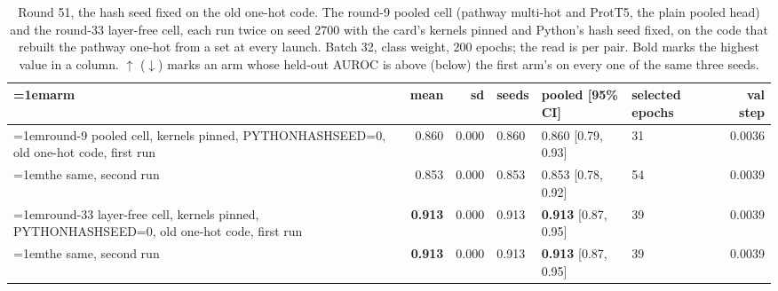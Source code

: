 \begin{table}[H]
  \centering
  \scriptsize
  \setlength{\tabcolsep}{2.5pt}
  \caption[Round 51, the hash seed fixed on the old one-hot code]{Round 51, the hash seed fixed on the old one-hot code. The round-9 pooled cell (pathway multi-hot and ProtT5, the plain pooled head) and the round-33 layer-free cell, each run twice on seed 2700 with the card's kernels pinned and Python's hash seed fixed, on the code that rebuilt the pathway one-hot from a set at every launch. Batch 32, class weight, 200 epochs; the read is per pair. Bold marks the highest value in a column. $\uparrow$ ($\downarrow$) marks an arm whose held-out AUROC is above (below) the first arm's on every one of the same three seeds.}
  \label{tab:w67}
  \begin{tabular}{@{}>{\raggedright\hangindent=1em\hangafter=1\arraybackslash}p{99.6mm}rrlllr@{}}
    \hline
    arm & mean & sd & seeds & pooled [95\% CI] & selected epochs & val step \\
    \hline
    round-9 pooled cell, kernels pinned, PYTHONHASHSEED=0, old one-hot code, first run & 0.860 & 0.000 & 0.860 & 0.860 [0.79, 0.93] & 31 & 0.0036 \\
    the same, second run & 0.853 & 0.000 & 0.853 & 0.853 [0.78, 0.92] & 54 & 0.0039 \\
    round-33 layer-free cell, kernels pinned, PYTHONHASHSEED=0, old one-hot code, first run & \textbf{0.913} & 0.000 & 0.913 & \textbf{0.913} [0.87, 0.95] & 39 & 0.0039 \\
    the same, second run & \textbf{0.913} & 0.000 & 0.913 & \textbf{0.913} [0.87, 0.95] & 39 & 0.0039 \\
    \hline
  \end{tabular}
\end{table}
